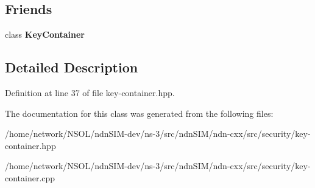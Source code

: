 \subsection*{Friends}
\begin{DoxyCompactItemize}
\item 
class {\bfseries Key\+Container}\hypertarget{classndn_1_1security_1_1KeyContainer_1_1const__iterator_ab0f6d8e87c0bfe8bad96d644f6776370}{}\label{classndn_1_1security_1_1KeyContainer_1_1const__iterator_ab0f6d8e87c0bfe8bad96d644f6776370}

\end{DoxyCompactItemize}


\subsection{Detailed Description}


Definition at line 37 of file key-\/container.\+hpp.



The documentation for this class was generated from the following files\+:\begin{DoxyCompactItemize}
\item 
/home/network/\+N\+S\+O\+L/ndn\+S\+I\+M-\/dev/ns-\/3/src/ndn\+S\+I\+M/ndn-\/cxx/src/security/key-\/container.\+hpp\item 
/home/network/\+N\+S\+O\+L/ndn\+S\+I\+M-\/dev/ns-\/3/src/ndn\+S\+I\+M/ndn-\/cxx/src/security/key-\/container.\+cpp\end{DoxyCompactItemize}
